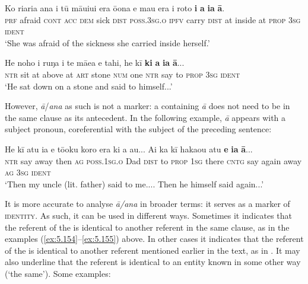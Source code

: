 \ea\label{ex:5.154}
\gll Ko ri{\ꞌ}ari{\ꞌ}a {\ꞌ}ana {\ꞌ}i tū māuiui era ō{\ꞌ}ona e ma{\ꞌ}u era {\ꞌ}i roto  \textbf{i} \textbf{a} \textbf{ia} \textbf{{\ꞌ}ā}.\\
\textsc{prf} afraid \textsc{cont} \textsc{acc} \textsc{dem} sick \textsc{dist} \textsc{poss.3sg.o} \textsc{ipfv} carry \textsc{dist} at inside  at \textsc{prop} \textsc{3sg} \textsc{ident}\\

\glt 
‘She was afraid of the sickness she carried inside herself.’ \textstyleExampleref{[R301.091]} 
\z

\ea\label{ex:5.155}
\gll He noho {\ꞌ}i ruŋa i te mā{\ꞌ}ea e tahi, he kī \textbf{ki} \textbf{a} \textbf{ia} \textbf{{\ꞌ}ā}... \\
\textsc{ntr} sit at above at \textsc{art} stone \textsc{num} one \textsc{ntr} say to \textsc{prop} \textsc{3sg} \textsc{ident} \\

\glt
‘He sat down on a stone and said to himself...’ \textstyleExampleref{[R229.365]} 
\z

However, \textit{{\ꞌ}ā}/\textit{{\ꞌ}ana} as such is not a  marker: a  containing \textit{{\ꞌ}ā} does not need to be in the same clause as its antecedent. In the following example, \textit{{\ꞌ}ā} appears with a subject pronoun, coreferential with the subject of the preceding sentence: 

\ea\label{ex:5.156}
\gll He kī atu ia e tō{\ꞌ}oku koro era ki a au... {\ꞌ}Ai ka kī  haka{\ꞌ}ou atu \textbf{e} \textbf{ia} \textbf{{\ꞌ}ā}...\\
\textsc{ntr} say away then \textsc{ag} \textsc{poss.1sg.o} Dad \textsc{dist} to \textsc{prop} \textsc{1sg} there \textsc{cntg} say  again away \textsc{ag} \textsc{3sg} \textsc{ident}\\

\glt
‘Then my uncle (lit. father) said to me.... Then he himself said again...’ \textstyleExampleref{[R230.254-6]}
\z

It is more accurate to analyse \textit{{\ꞌ}ā/{\ꞌ}ana} in broader terms: it serves as a marker of \textsc{identity}. As such, it can be used in different ways. Sometimes it indicates that the referent of the  is identical to another referent in the same clause, as in the  examples (\ref{ex:5.154}–\ref{ex:5.155}) above. In other cases it indicates that the referent of the  is identical to another referent mentioned earlier in the text, as in . It may also underline that the referent is identical to an entity known in some other way (‘the same’). Some examples:

